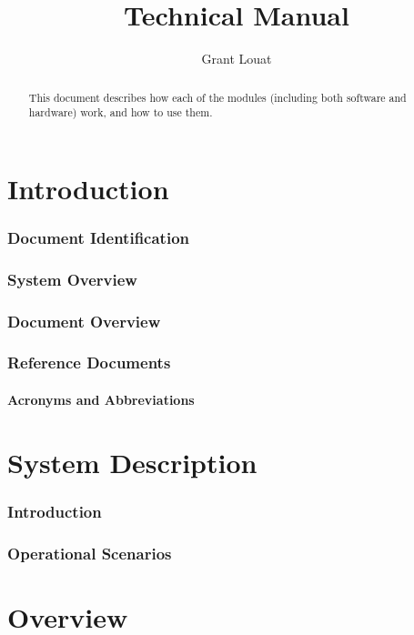 \documentclass[]{report}
\title{Technical Manual}
\author{Grant Louat}
\begin{document}
\maketitle

\begin{abstract}
	This document describes how each of the modules (including both software and hardware) work, and how to use them.
\end{abstract}

\part{Introduction}
\section{Document Identification}

\section{System Overview}

\section{Document Overview}

\section{Reference Documents}

\subsection{Acronyms and Abbreviations}

\part{System Description}
\section{Introduction}

\section{Operational Scenarios}

\part{Overview}
\end{document}
